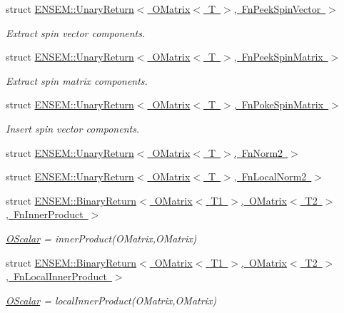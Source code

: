 \begin{DoxyCompactItemize}
struct \mbox{\hyperlink{structENSEM_1_1UnaryReturn_3_01OMatrix_3_01T_01_4_00_01FnPeekSpinVector_01_4}{E\+N\+S\+E\+M\+::\+Unary\+Return$<$ O\+Matrix$<$ T $>$, Fn\+Peek\+Spin\+Vector $>$}}
\begin{DoxyCompactList}\small\item\em Extract spin vector components. \end{DoxyCompactList}\item 
struct \mbox{\hyperlink{structENSEM_1_1UnaryReturn_3_01OMatrix_3_01T_01_4_00_01FnPeekSpinMatrix_01_4}{E\+N\+S\+E\+M\+::\+Unary\+Return$<$ O\+Matrix$<$ T $>$, Fn\+Peek\+Spin\+Matrix $>$}}
\begin{DoxyCompactList}\small\item\em Extract spin matrix components. \end{DoxyCompactList}\item 
struct \mbox{\hyperlink{structENSEM_1_1UnaryReturn_3_01OMatrix_3_01T_01_4_00_01FnPokeSpinMatrix_01_4}{E\+N\+S\+E\+M\+::\+Unary\+Return$<$ O\+Matrix$<$ T $>$, Fn\+Poke\+Spin\+Matrix $>$}}
\begin{DoxyCompactList}\small\item\em Insert spin vector components. \end{DoxyCompactList}\item 
struct \mbox{\hyperlink{structENSEM_1_1UnaryReturn_3_01OMatrix_3_01T_01_4_00_01FnNorm2_01_4}{E\+N\+S\+E\+M\+::\+Unary\+Return$<$ O\+Matrix$<$ T $>$, Fn\+Norm2 $>$}}
\item 
struct \mbox{\hyperlink{structENSEM_1_1UnaryReturn_3_01OMatrix_3_01T_01_4_00_01FnLocalNorm2_01_4}{E\+N\+S\+E\+M\+::\+Unary\+Return$<$ O\+Matrix$<$ T $>$, Fn\+Local\+Norm2 $>$}}
\item 
struct \mbox{\hyperlink{structENSEM_1_1BinaryReturn_3_01OMatrix_3_01T1_01_4_00_01OMatrix_3_01T2_01_4_00_01FnInnerProduct_01_4}{E\+N\+S\+E\+M\+::\+Binary\+Return$<$ O\+Matrix$<$ T1 $>$, O\+Matrix$<$ T2 $>$, Fn\+Inner\+Product $>$}}
\begin{DoxyCompactList}\small\item\em \mbox{\hyperlink{classENSEM_1_1OScalar}{O\+Scalar}} = inner\+Product(\+O\+Matrix,\+O\+Matrix) \end{DoxyCompactList}\item 
struct \mbox{\hyperlink{structENSEM_1_1BinaryReturn_3_01OMatrix_3_01T1_01_4_00_01OMatrix_3_01T2_01_4_00_01FnLocalInnerProduct_01_4}{E\+N\+S\+E\+M\+::\+Binary\+Return$<$ O\+Matrix$<$ T1 $>$, O\+Matrix$<$ T2 $>$, Fn\+Local\+Inner\+Product $>$}}
\begin{DoxyCompactList}\small\item\em \mbox{\hyperlink{classENSEM_1_1OScalar}{O\+Scalar}} = local\+Inner\+Product(\+O\+Matrix,\+O\+Matrix) \end{DoxyCompactList}\item 

\end{DoxyCompactItemize}
